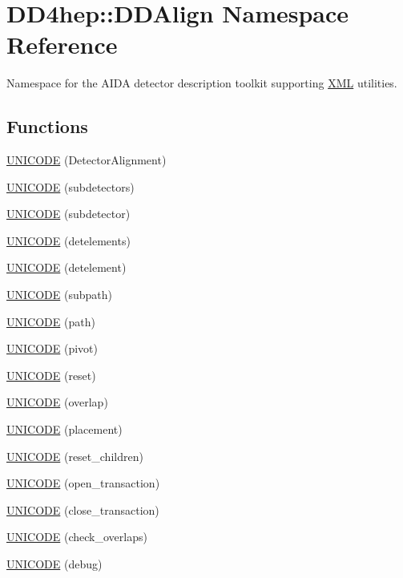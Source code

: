 \hypertarget{namespace_d_d4hep_1_1_d_d_align}{
\section{DD4hep::DDAlign Namespace Reference}
\label{namespace_d_d4hep_1_1_d_d_align}
}


Namespace for the AIDA detector description toolkit supporting \hyperlink{namespace_d_d4hep_1_1_x_m_l}{XML} utilities.  
\subsection*{Functions}
\begin{DoxyCompactItemize}
\item 
\hyperlink{namespace_d_d4hep_1_1_d_d_align_a92ddad3190005e748fdd69016eba6d3d}{UNICODE} (DetectorAlignment)
\item 
\hyperlink{namespace_d_d4hep_1_1_d_d_align_adda071bc0503c76adf54dfbf8cc47c98}{UNICODE} (subdetectors)
\item 
\hyperlink{namespace_d_d4hep_1_1_d_d_align_a8a0d0deddfffbf557cbdf46a8eac0045}{UNICODE} (subdetector)
\item 
\hyperlink{namespace_d_d4hep_1_1_d_d_align_a156a05fc9ee543a85aed3b3c832b3e80}{UNICODE} (detelements)
\item 
\hyperlink{namespace_d_d4hep_1_1_d_d_align_a72c0978998ad85f333f503745e62a9f5}{UNICODE} (detelement)
\item 
\hyperlink{namespace_d_d4hep_1_1_d_d_align_a192bfc877a53b705836a19ac5cc2555c}{UNICODE} (subpath)
\item 
\hyperlink{namespace_d_d4hep_1_1_d_d_align_adeebe0d2039ea49dce1baa19de842fd4}{UNICODE} (path)
\item 
\hyperlink{namespace_d_d4hep_1_1_d_d_align_a65c6d08fad497f0a597726589c202645}{UNICODE} (pivot)
\item 
\hyperlink{namespace_d_d4hep_1_1_d_d_align_a0a453e176add03a3cf85656e7569df85}{UNICODE} (reset)
\item 
\hyperlink{namespace_d_d4hep_1_1_d_d_align_a8a4fad494de91372f0b4a3c955838ccd}{UNICODE} (overlap)
\item 
\hyperlink{namespace_d_d4hep_1_1_d_d_align_acec73bceb26ad68abc9dcc39fa693923}{UNICODE} (placement)
\item 
\hyperlink{namespace_d_d4hep_1_1_d_d_align_ad9dbc7e91e018e588a15156da6301666}{UNICODE} (reset\_\-children)
\item 
\hyperlink{namespace_d_d4hep_1_1_d_d_align_a3e55e7bb8f6ced963649271e80d38ef7}{UNICODE} (open\_\-transaction)
\item 
\hyperlink{namespace_d_d4hep_1_1_d_d_align_ad8b81995e9e734f3de4f7b3fcc71b969}{UNICODE} (close\_\-transaction)
\item 
\hyperlink{namespace_d_d4hep_1_1_d_d_align_aa5e5a3c901780b457658bd9825bb376a}{UNICODE} (check\_\-overlaps)
\item 
\hyperlink{namespace_d_d4hep_1_1_d_d_align_ae4e3eb8b7bab297efc0079f41e26d25f}{UNICODE} (debug)
\end{DoxyCompactItemize}


